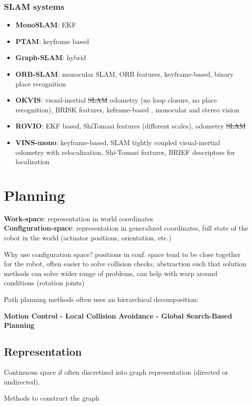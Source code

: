 \documentclass[fontsize=6pt]{scrartcl}
\begin{document}
\begin{multicols*}{4}
\subsubsection*{SLAM systems}
\begin{itemize}
\item \textbf{MonoSLAM}: EKF
\item \textbf{PTAM}: keyframe based
\item \textbf{Graph-SLAM}: hybrid
\item \textbf{ORB-SLAM}: monocular SLAM, ORB features, keyframe-based, binary place recognition
\item \textbf{OKVIS}: visual-inertial \st{SLAM} odometry (no loop closure, no place recognition), BRISK features, keframe-based , monocular and stereo vision
\item \textbf{ROVIO}: EKF based, ShiTomasi features (different scales), odometry \st{SLAM}
\item \textbf{VINS-mono}: keyframe-based, SLAM tightly coupled visual-inertial odometry with relocalization, Shi-Tomasi features, BRIEF descriptors for localization
\end{itemize}

\section*{Planning}
\textbf{Work-space}: representation in world coordinates\\
\textbf{Configuration-space}: representation in generalized coordinates, full state of the robot in the world (actuator positions, orientation, etc.)

Why use configuration space? positions in conf. space tend to be close together for the robot, often easier to solve collision checks, abstraction such that solution methods can solve wider range of problems, can help with warp around conditions (rotation joints)

Path planning methods often uses an hierarchical decomposition:

\textbf{Motion Control - Local Collision Avoidance - Global Search-Based Planning}

\subsection*{Representation}

Continuous space if often discretized into graph representation (directed or undirected).

Methods to construct the graph


\end{multicols*}
\end{document}
